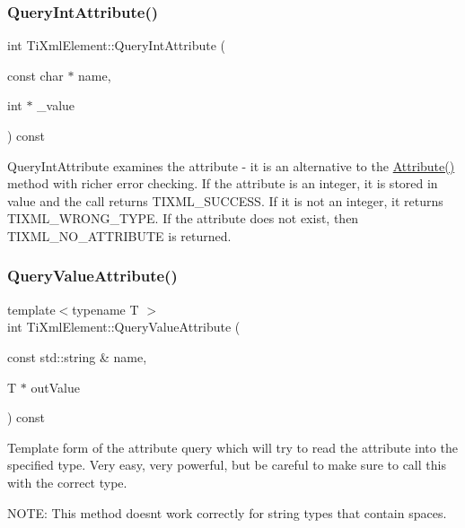 \subsubsection{\texorpdfstring{Query\+Int\+Attribute()}{QueryIntAttribute()}}
{\footnotesize\ttfamily int Ti\+Xml\+Element\+::\+Query\+Int\+Attribute (\begin{DoxyParamCaption}\item[{const char $\ast$}]{name,  }\item[{int $\ast$}]{\+\_\+value }\end{DoxyParamCaption}) const}

Query\+Int\+Attribute examines the attribute -\/ it is an alternative to the \hyperlink{class_ti_xml_element_a6042f518748f475a7ac4b4e0b509eb05}{Attribute()} method with richer error checking. If the attribute is an integer, it is stored in \textquotesingle{}value\textquotesingle{} and the call returns T\+I\+X\+M\+L\+\_\+\+S\+U\+C\+C\+E\+SS. If it is not an integer, it returns T\+I\+X\+M\+L\+\_\+\+W\+R\+O\+N\+G\+\_\+\+T\+Y\+PE. If the attribute does not exist, then T\+I\+X\+M\+L\+\_\+\+N\+O\+\_\+\+A\+T\+T\+R\+I\+B\+U\+TE is returned. \mbox{\label{class_ti_xml_element_a7530db879b81ebaba61bf62a9770d204}} 
\subsubsection{\texorpdfstring{Query\+Value\+Attribute()}{QueryValueAttribute()}}
{\footnotesize\ttfamily template$<$typename T $>$ \\
int Ti\+Xml\+Element\+::\+Query\+Value\+Attribute (\begin{DoxyParamCaption}\item[{const std\+::string \&}]{name,  }\item[{T $\ast$}]{out\+Value }\end{DoxyParamCaption}) const\hspace{0.3cm}{\ttfamily [inline]}}

Template form of the attribute query which will try to read the attribute into the specified type. Very easy, very powerful, but be careful to make sure to call this with the correct type.

N\+O\+TE\+: This method doesn\textquotesingle{}t work correctly for \textquotesingle{}string\textquotesingle{} types that contain spaces.

